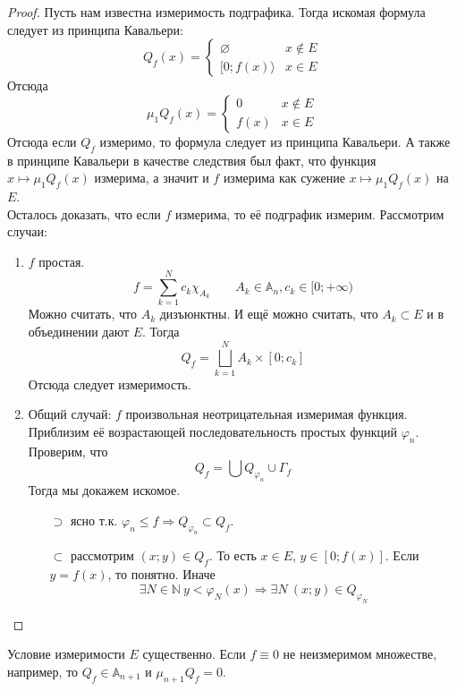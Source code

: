 \documentclass{article}
\let\tmp\varphi
\let\varphi\phi
\let\phi\tmp
\begin{document}
    \begin{proof}
        Пусть нам известна измеримость подграфика. Тогда искомая формула следует из принципа Кавальери:
        $$
        Q_f(x)=\begin{cases}
            \varnothing & x\notin E\\
            [0;f(x)\rangle & x\in E
        \end{cases}
        $$
        Отсюда
        $$
        \mu_1Q_f(x)=\begin{cases}
            0 & x\notin E\\
            f(x) & x\in E
        \end{cases}
        $$
        Отсюда если $Q_f$ измеримо, то формула следует из принципа Кавальери. А также в принципе Кавальери в качестве следствия был факт, что функция $x\mapsto\mu_1Q_f(x)$ измерима, а значит и $f$ измерима как сужение $x\mapsto\mu_1Q_f(x)$ на $E$.\\
        Осталось доказать, что если $f$ измерима, то её подграфик измерим. Рассмотрим случаи:
        \begin{enumerate}
            \item $f$ простая.
            $$
            f=\sum\limits_{k=1}^Nc_k\chi_{A_k}\qquad A_k\in\mathbb A_n,c_k\in[0;+\infty)
            $$
            Можно считать, что $A_k$ дизъюнктны. И ещё можно считать, что $A_k\subset E$ и в объединении дают $E$. Тогда
            $$
            Q_f=\bigsqcup_{k=1}^NA_k\times[0;c_k]
            $$
            Отсюда следует измеримость.
            \item Общий случай: $f$ произвольная неотрицательная измеримая функция. Приблизим её возрастающей последовательность простых функций $\phi_n$. Проверим, что 
            $$
            Q_f=\bigcup Q_{\phi_n}\cup\Gamma_f
            $$
            Тогда мы докажем искомое.
            \begin{itemize}
                \item[$\supset$] ясно т.к. $\phi_n\leqslant f\Rightarrow Q_{\phi_n}\subset Q_f$.
                \item[$\subset$] рассмотрим $(x;y)\in Q_f$. То есть $x\in E$, $y\in[0;f(x)]$. Если $y=f(x)$, то понятно. Иначе
                $$
                \exists N\in\mathbb N~y<\phi_N(x)\Rightarrow \exists N~(x;y)\in Q_{\phi_N}
                $$
            \end{itemize}
        \end{enumerate}
    \end{proof}
    \begin{remark}
        Условие измеримости $E$ существенно. Если $f\equiv0$ не неизмеримом множестве, например, то $Q_f\in\mathbb A_{n+1}$ и $\mu_{n+1}Q_f=0$.
    \end{remark}
\end{document}
